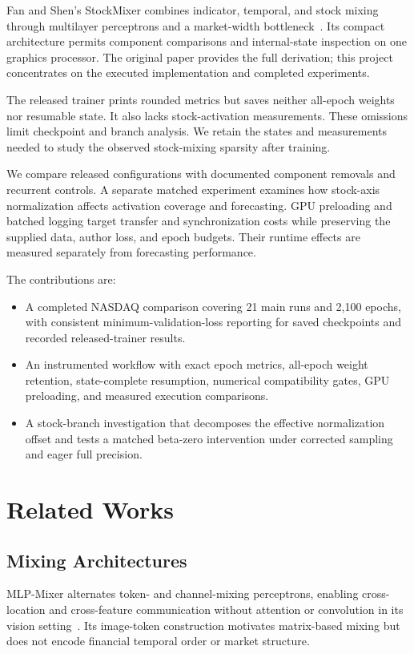 \documentclass[conference]{IEEEtran}
\begin{document}
Fan and Shen's StockMixer combines indicator, temporal, and stock mixing through multilayer perceptrons and a market-width bottleneck~\cite{stockmixer}. Its compact architecture permits component comparisons and internal-state inspection on one graphics processor. The original paper provides the full derivation; this project concentrates on the executed implementation and completed experiments.

The released trainer prints rounded metrics but saves neither all-epoch weights nor resumable state. It also lacks stock-activation measurements. These omissions limit checkpoint and branch analysis. We retain the states and measurements needed to study the observed stock-mixing sparsity after training.

We compare released configurations with documented component removals and recurrent controls. A separate matched experiment examines how stock-axis normalization affects activation coverage and forecasting. GPU preloading and batched logging target transfer and synchronization costs while preserving the supplied data, author loss, and epoch budgets. Their runtime effects are measured separately from forecasting performance.

The contributions are:
\begin{itemize}
\item A completed NASDAQ comparison covering 21 main runs and 2,100 epochs, with consistent minimum-validation-loss reporting for saved checkpoints and recorded released-trainer results.
\item An instrumented workflow with exact epoch metrics, all-epoch weight retention, state-complete resumption, numerical compatibility gates, GPU preloading, and measured execution comparisons.
\item A stock-branch investigation that decomposes the effective normalization offset and tests a matched beta-zero intervention under corrected sampling and eager full precision.
\end{itemize}

\section{Related Works}
\subsection{Mixing Architectures}
MLP-Mixer alternates token- and channel-mixing perceptrons, enabling cross-location and cross-feature communication without attention or convolution in its vision setting~\cite{mlpmixer}. Its image-token construction motivates matrix-based mixing but does not encode financial temporal order or market structure.
\end{document}
